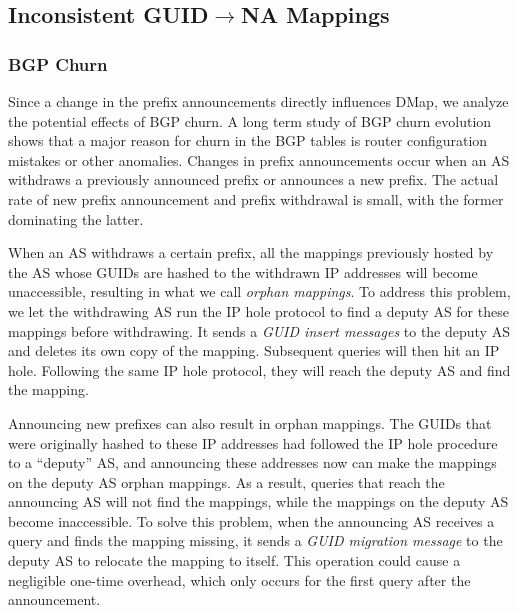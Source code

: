 \subsection{Inconsistent GUID$\rightarrow$NA Mappings}
\label{sub:inconsistency}

\subsubsection{BGP Churn} Since a change in the prefix announcements directly influences DMap, we analyze the potential effects of BGP churn. A long term study of BGP churn evolution~\cite{elmokashfi} shows that a major reason for churn in the BGP tables is router configuration mistakes or other anomalies. Changes in prefix announcements occur when an AS withdraws a previously announced prefix or announces a new prefix.  The actual rate of new prefix announcement and prefix withdrawal is small, with the former dominating the latter.

When an AS withdraws a certain prefix, all the mappings previously hosted by the AS whose GUIDs are hashed to the withdrawn IP addresses will become unaccessible, resulting in what we call \emph{orphan mappings}.   To address this problem, we let the withdrawing AS run the IP hole protocol to find a deputy AS for these mappings before withdrawing. It sends  a \emph{GUID insert messages} to the deputy AS and deletes its own copy of the mapping. Subsequent queries will then hit an IP hole. Following the same IP hole protocol, they will reach the deputy AS and find the mapping.

Announcing new prefixes can also result in orphan mappings. The GUIDs that were originally hashed to these IP addresses had followed the IP hole procedure to a ``deputy'' AS, and announcing these addresses now can make the mappings on the deputy AS orphan mappings. As a result, queries that reach the announcing AS will not find the mappings, while the mappings on the deputy AS become inaccessible. To solve this problem, when the announcing AS receives a query and finds the mapping missing, it sends a \emph{GUID migration message} to the deputy AS to relocate the mapping to itself. This operation could cause a negligible one-time overhead, which only occurs for the first query after the announcement.



